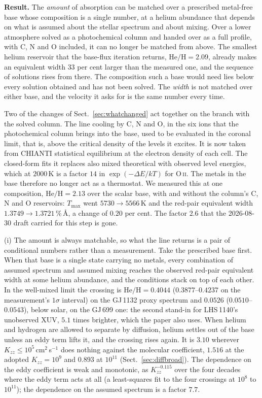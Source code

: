 \documentclass[english,a4paper]{my_memo}
\begin{document}
\medskip
\noindent\textbf{Result.} The \emph{amount} of absorption can be matched over
a prescribed metal-free base whose composition is a single number, at a
helium abundance that depends on what is assumed about the stellar spectrum
and about mixing. Over a lower atmosphere solved as a photochemical column
and handed over as a full profile, with C, N and O included, it can no longer
be matched from above. The smallest helium reservoir that the base-flux
iteration returns, $\mathrm{He/H} = 2.09$, already makes an equivalent width
$33$ per cent larger than the measured one, and the sequence of solutions
rises from there. The composition such a base would need lies below every
solution obtained and has not been solved. The \emph{width} is not matched
over either base, and the velocity it asks for is the same number every time.

\medskip
\noindent Two of the changes of Sect.~\ref{sec:whatchanged} act together on
the branch with the solved column. The line cooling by C, N and O, in the six
ions that the photochemical column brings into the base, used to be evaluated
in the coronal limit, that is, above the critical density of the levels it
excites. It is now taken from CHIANTI statistical equilibrium at the electron
density of each cell. The closed-form fits it replaces also mixed theoretical
with observed level energies, which at $2000$\,K is a factor $14$ in
$\exp(-\Delta E/kT)$ for O\,\textsc{ii}. The metals in the base therefore no
longer act as a thermostat. We measured this at one composition,
$\mathrm{He/H} = 2.13$ over the scalar base, with and without the column's C,
N and O reservoirs: $T_{\max}$ went $5730 \to 5566$\,K and the red-pair
equivalent width $1.3749 \to 1.3721$\,\%\,\AA{}, a change of $0.20$ per cent.
The factor $2.6$ that the 2026-08-30 draft carried for this step is gone.

\medskip
\noindent (i) The amount is always matchable, so what the line returns is a
pair of conditional numbers rather than a measurement. Take the prescribed
base first. When that base is a single state carrying no metals, every
combination of assumed spectrum and assumed mixing reaches the observed
red-pair equivalent width at some helium abundance, and the conditions stack
on top of each other. In the well-mixed limit the crossing is
$\mathrm{He/H} = 0.4044$ ($0.3877$--$0.4237$ on the measurement's $1\sigma$
interval) on the GJ\,1132 proxy spectrum and $0.0526$ ($0.0510$--$0.0543$),
below solar, on the GJ\,699 one: the second stand-in for LHS\,1140's
unobserved XUV, $5.1$ times brighter, which the paper also uses. When helium
and hydrogen are allowed to separate by diffusion, helium settles out of the
base unless an eddy term lifts it, and the crossing rises again. It is $3.10$
wherever $K_{zz} \le 10^{5}$\,cm$^2$\,s$^{-1}$ does nothing against the
molecular coefficient, $1.516$ at the adopted $K_{zz} = 10^{9}$ and $0.893$
at $10^{11}$ (Sect.~\ref{sec:diffbroad}). The dependence on the eddy
coefficient is weak and monotonic, as $K_{zz}^{-0.115}$ over the four decades
where the eddy term acts at all (a least-squares fit to the four crossings at
$10^{8}$ to $10^{11}$); the dependence on the assumed spectrum is a factor
$7.7$.
\end{document}
